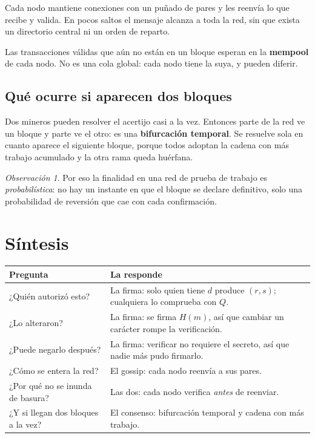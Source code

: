 \documentclass[11pt,a4paper]{article}
\theoremstyle{definition}
\theoremstyle{plain}
\theoremstyle{remark}
\newtheorem*{observacion}{Observación}
\begin{document}
Cada nodo mantiene conexiones con un puñado de pares y les reenvía lo que recibe
y valida. En pocos saltos el mensaje alcanza a toda la red, sin que exista un
directorio central ni un orden de reparto.

Las transacciones válidas que aún no están en un bloque esperan en la
\textbf{mempool} de cada nodo. No es una cola global: cada nodo tiene la suya, y
pueden diferir.

\subsection{Qué ocurre si aparecen dos bloques}

Dos mineros pueden resolver el acertijo casi a la vez. Entonces parte de la red
ve un bloque y parte ve el otro: es una \textbf{bifurcación temporal}. Se resuelve
sola en cuanto aparece el siguiente bloque, porque todos adoptan la cadena con
más trabajo acumulado y la otra rama queda huérfana.

\begin{observacion}
Por eso la finalidad en una red de prueba de trabajo es \emph{probabilística}: no
hay un instante en que el bloque se declare definitivo, solo una probabilidad de
reversión que cae con cada confirmación.
\end{observacion}

\section{Síntesis}\label{sec:sintesis}

\begin{center}
\small
\begin{tabularx}{\textwidth}{@{}lX@{}}
\toprule
Pregunta & La responde \\
\midrule
¿Quién autorizó esto?        & La firma: solo quien tiene $d$ produce $(r,s)$; cualquiera lo comprueba con $Q$. \\
¿Lo alteraron?               & La firma: se firma $H(m)$, así que cambiar un carácter rompe la verificación. \\
¿Puede negarlo después?      & La firma: verificar no requiere el secreto, así que nadie más pudo firmarlo. \\
¿Cómo se entera la red?      & El gossip: cada nodo reenvía a sus pares. \\
¿Por qué no se inunda de basura? & Las dos: cada nodo verifica \emph{antes} de reenviar. \\
¿Y si llegan dos bloques a la vez? & El consenso: bifurcación temporal y cadena con más trabajo. \\
\bottomrule
\end{tabularx}
\end{center}
\end{document}
